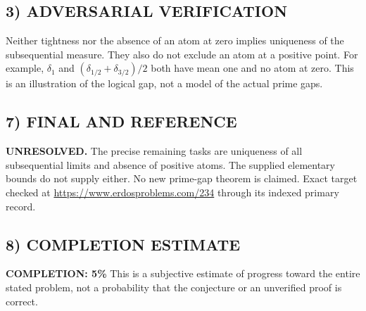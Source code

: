 \subsection*{3) ADVERSARIAL VERIFICATION}
Neither tightness nor the absence of an atom at zero implies uniqueness of
the subsequential measure. They also do not exclude an atom at a positive
point. For example, $\delta_1$ and $(\delta_{1/2}+\delta_{3/2})/2$ both have
mean one and no atom at zero. This is an illustration of the logical gap,
not a model of the actual prime gaps.

\subsection*{7) FINAL AND REFERENCE}
\textbf{UNRESOLVED.} The precise remaining tasks are uniqueness of all
subsequential limits and absence of positive atoms. The supplied elementary
bounds do not supply either. No new prime-gap theorem is claimed.
Exact target checked at \url{https://www.erdosproblems.com/234} through its
indexed primary record.

\subsection*{8) COMPLETION ESTIMATE}
\textbf{COMPLETION: 5\%}
This is a subjective estimate of progress toward the entire stated problem, not a probability that the conjecture or an unverified proof is correct.
